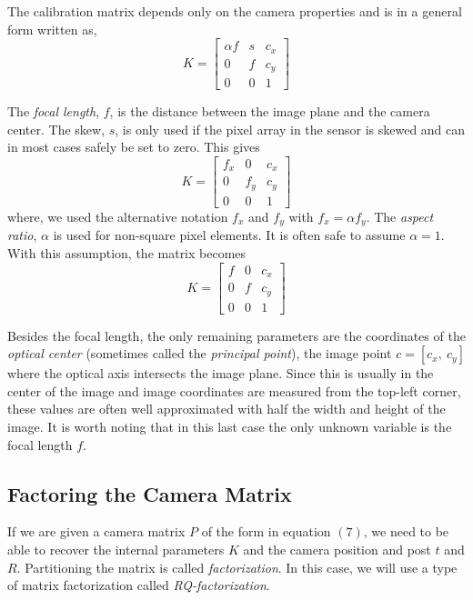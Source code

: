 \documentclass[a4paper,12pt]{extarticle}
\theoremstyle{mytheor}
\begin{document}
The calibration matrix depends only on the camera properties and is in a general form written as, 
\begin{equation}
K = \left[
\begin{array}{ccc}
\alpha f & s & c_{x} \\
0 & f & c_{y} \\
0 & 0 & 1
\end{array}
\right]
\end{equation}

The \emph{focal length}, $f$, is the distance between the image plane and the camera center. The skew, $s$, is only used if the pixel array in the sensor is skewed and can in most cases safely be set to zero. This gives
\begin{equation}
K = \left[
\begin{array}{ccc}
f_{x} & 0 & c_{x} \\
0 & f_{y} & c_{y} \\
0 & 0 & 1
\end{array}
\right]
\end{equation}
where, we used the alternative notation $f_{x}$ and $f_{y}$ with $f_{x} = \alpha f_{y} $. 
\newline
The \emph{aspect ratio}, $\alpha$ is used for non-square pixel elements. It is often safe to assume $\alpha = 1$. With this assumption, the matrix becomes
\begin{equation}
K = \left[
\begin{array}{ccc}
f & 0 & c_{x} \\
0 & f & c_{y} \\
0 & 0 & 1
\end{array}
\right]
\end{equation}


Besides the focal length, the only remaining parameters are the coordinates of the \emph{optical center} (sometimes called the \emph{principal point}), the image point $c = [c_{x}, \: c_{y}]$ where the optical axis intersects the image plane. Since this is usually in the center of the image and image coordinates are measured from the top-left corner, these values are often well approximated with half the width and height of the image. It is worth noting that in this last case the only unknown variable is the focal length $f$.


\subsection{Factoring the Camera Matrix}
If we are given a camera matrix $P$ of the form in equation $(7)$, we need to be able to recover the internal parameters $K$ and the camera position and post $t$ and $R$. Partitioning the matrix is called \emph{factorization}. In this case, we will use a type of matrix factorization called \emph{RQ-factorization}.
\end{document}
